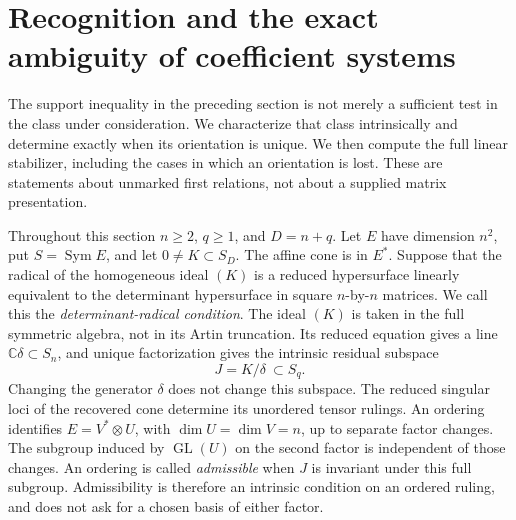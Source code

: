 \documentclass[11pt,reqno]{amsart}
\numberwithin{equation}{section}
\theoremstyle{definition}\newtheorem{definition}[theorem]{Definition}
\theoremstyle{remark}\newtheorem{remark}[theorem]{Remark}
\newcommand{\C}{\mathbb C}\newcommand{\Q}{\mathbb Q}
\DeclareMathOperator{\Sym}{Sym}\DeclareMathOperator{\Gr}{Gr}
\begin{document}
\section{Recognition and the exact ambiguity of coefficient systems}
\label{sec:coefficient-symmetries-v148}

The support inequality in the preceding section is not merely a
sufficient test in the class under consideration.  We characterize
that class intrinsically and determine exactly when its orientation
is unique.  We then compute the full linear stabilizer, including
the cases in which an orientation is lost.  These are statements
about unmarked first relations, not about a supplied matrix
presentation.

Throughout this section \(n\ge2\), \(q\ge1\), and \(D=n+q\).
Let \(E\) have dimension \(n^2\), put \(S=\Sym E\), and let
\(0\ne K\subset S_D\).  The affine cone is in \(E^*\).
Suppose that the radical of the homogeneous ideal \((K)\) is a
reduced hypersurface linearly equivalent to the determinant
hypersurface in square \(n\)-by-\(n\) matrices.  We call this the
\emph{determinant-radical condition}.  The ideal \((K)\) is taken
in the full symmetric algebra, not in its Artin truncation.
Its reduced equation gives a line \(\C\delta\subset S_n\),
and unique factorization gives the intrinsic residual subspace
\begin{equation}\label{eq:residual-recognition-v148}
                   J=K/\delta\ \subset S_q.
\end{equation}
Changing the generator \(\delta\) does not change this subspace.
The reduced singular loci of the recovered cone determine its
unordered tensor rulings.  An ordering identifies
\(E=V^*\otimes U\), with \(\dim U=\dim V=n\), up to
separate factor changes.  The subgroup induced by
\(\operatorname{GL}(U)\) on the second factor is independent of
those changes.  An ordering is called \emph{admissible} when
\(J\) is invariant under this full subgroup.  Admissibility is
therefore an intrinsic condition on an ordered ruling, and does
not ask for a chosen basis of either factor.
\end{document}
